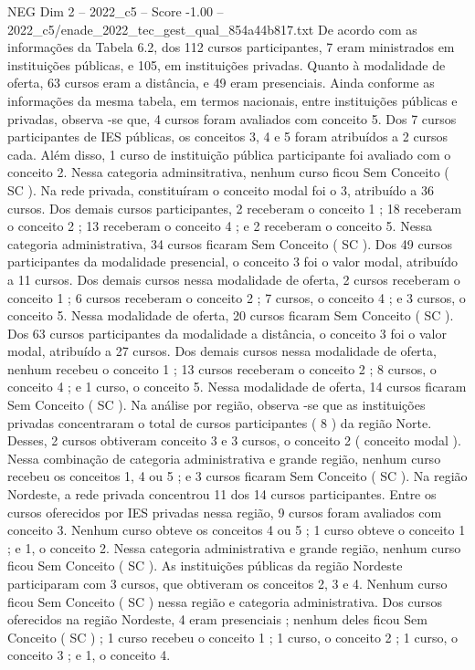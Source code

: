 \begin{textsample}{NEG Dim 2 – 2022\_c5 – Score -1.00 – 2022\_c5/enade\_2022\_tec\_gest\_qual\_854a44b817.txt}
De acordo com as informações da Tabela 6.2, dos 112 cursos participantes, 7 eram ministrados em instituições públicas, e 105, em instituições privadas.
Quanto à modalidade de oferta, 63 cursos eram a distância, e 49 eram presenciais.
Ainda conforme as informações da mesma tabela, em termos nacionais, entre instituições públicas e privadas, observa -se que, 4 cursos foram avaliados com conceito 5.
Dos 7 cursos participantes de IES públicas, os conceitos 3, 4 e 5 foram atribuídos a 2 cursos cada.
Além disso, 1 curso de instituição pública participante foi avaliado com o conceito 2.
Nessa categoria adminsitrativa, nenhum curso ficou Sem Conceito ( SC ).
Na rede privada, constituíram o conceito modal foi o 3, atribuído a 36 cursos.
Dos demais cursos participantes, 2 receberam o conceito 1 ; 18 receberam o conceito 2 ; 13 receberam o conceito 4 ; e 2 receberam o conceito 5.
Nessa categoria administrativa, 34 cursos ficaram Sem Conceito ( SC ).
Dos 49 cursos participantes da modalidade presencial, o conceito 3 foi o valor modal, atribuído a 11 cursos.
Dos demais cursos nessa modalidade de oferta, 2 cursos receberam o conceito 1 ; 6 cursos receberam o conceito 2 ; 7 cursos, o conceito 4 ; e 3 cursos, o conceito 5.
Nessa modalidade de oferta, 20 cursos ficaram Sem Conceito ( SC ).
Dos 63 cursos participantes da modalidade a distância, o conceito 3 foi o valor modal, atribuído a 27 cursos.
Dos demais cursos nessa modalidade de oferta, nenhum recebeu o conceito 1 ; 13 cursos receberam o conceito 2 ; 8 cursos, o conceito 4 ; e 1 curso, o conceito 5.
Nessa modalidade de oferta, 14 cursos ficaram Sem Conceito ( SC ).
Na análise por região, observa -se que as instituições privadas concentraram o total de cursos participantes ( 8 ) da região Norte.
Desses, 2 cursos obtiveram conceito 3 e 3 cursos, o conceito 2 ( conceito modal ).
Nessa combinação de categoria administrativa e grande região, nenhum curso recebeu os conceitos 1, 4 ou 5 ; e 3 cursos ficaram Sem Conceito ( SC ).
Na região Nordeste, a rede privada concentrou 11 dos 14 cursos participantes.
Entre os cursos oferecidos por IES privadas nessa região, 9 cursos foram avaliados com conceito 3.
Nenhum curso obteve os conceitos 4 ou 5 ; 1 curso obteve o conceito 1 ; e 1, o conceito 2.
Nessa categoria administrativa e grande região, nenhum curso ficou Sem Conceito ( SC ).
As instituições públicas da região Nordeste participaram com 3 cursos, que obtiveram os conceitos 2, 3 e 4.
Nenhum curso ficou Sem Conceito ( SC ) nessa região e categoria administrativa.
Dos cursos oferecidos na região Nordeste, 4 eram presenciais ; nenhum deles ficou Sem Conceito ( SC ) ; 1 curso recebeu o conceito 1 ; 1 curso, o conceito 2 ; 1 curso, o conceito 3 ; e 1, o conceito 4.

\end{textsample}
